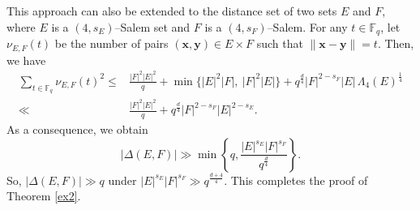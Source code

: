 \documentclass[11pt]{article}
\begin{document}
This approach can also be extended to the distance set of two sets $E$ and $F$, where $E$ is a $(4, s_E)$--Salem set and $F$ is a $(4, s_F)$--Salem. For any $t\in \mathbb{F}_q$, let $\nu_{E, F}(t)$ be the number of pairs $(\mathbf{x}, \mathbf{y})\in E\times F$ such that $\|\mathbf{x}-\mathbf{y}\|=t$. Then, we have 
\begin{align*}
    \sum_{t\in \mathbb{F}_q}\nu_{E, F}(t)^2\le & \frac{|F|^2|E|^2}{q}+\min\{|E|^2|F|, ~|F|^2|E|\}+q^{\frac{d}{4}}|F|^{2-s_F}|E| \, \Lambda_4(E)^{\frac{1}{4}} \\
    \ll &\frac{|F|^2|E|^2}{q}+q^{\frac{d}{4}}|F|^{2-s_F}|E|^{2-s_E}.
\end{align*}
As a consequence, we obtain 
\[|\Delta(E, F)|\gg \min \left\lbrace q, \frac{|E|^{s_E}|F|^{s_F}}{q^{\frac{d}{4}}} \right\rbrace.\]
So, $|\Delta(E, F)|\gg q$ under $|E|^{s_E}|F|^{s_F}\gg q^{\frac{d+4}{4}}$. This completes the proof of Theorem \ref{ex2}.


\end{document}
